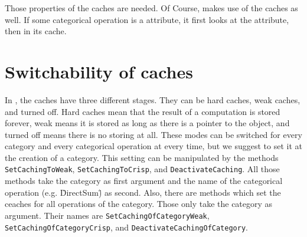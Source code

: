 Those properties of the \CapPkg caches are needed. Of Course, \CapPkg makes use of the \GAP caches as well. If some categorical
operation is a \GAP attribute, it first looks at the \GAP attribute, then in its \CapPkg cache.

\section{Switchability of caches}

In \CapPkg, the caches have three different stages. They can be hard caches, weak caches, and turned off.
Hard caches mean that the result of a computation is stored forever, weak means it is stored as long as
there is a pointer to the object, and turned off means there is no storing at all. These modes can be switched for
every category and every categorical operation at every time, but we suggest to set it at the creation of a category.
This setting can be manipulated by the methods \texttt{SetCachingToWeak}, \texttt{SetCachingToCrisp}, and \texttt{DeactivateCaching}.
All those methods take the category as first argument and the name of the categorical operation (e.g. \"DirectSum\") as second.
Also, there are methods which set the ceaches for all operations of the category. Those only take the category as argument.
Their names are \texttt{SetCachingOfCategoryWeak}, \texttt{SetCachingOfCategoryCrisp}, and \texttt{DeactivateCachingOfCategory}.


